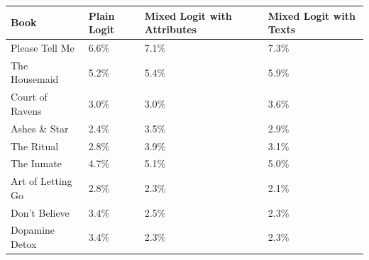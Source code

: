 \begin{centering}
\begin{tabular}{>{\raggedright}p{5cm}>{\raggedright}p{2cm}>{\centering}p{2cm}>{\centering}p{2cm}}
\hline
{\footnotesize\textbf{Book}} & {\footnotesize\textbf{Plain Logit}} & {\footnotesize\textbf{Mixed Logit with Attributes}} & {\footnotesize\textbf{Mixed Logit with Texts}}\tabularnewline
\hline
{\footnotesize Please Tell Me} & {\footnotesize 6.6\%} & {\footnotesize 7.1\%} & {\footnotesize 7.3\%}\tabularnewline
{\footnotesize The Housemaid} & {\footnotesize 5.2\%} & {\footnotesize 5.4\%} & {\footnotesize 5.9\%}\tabularnewline
{\footnotesize Court of Ravens} & {\footnotesize 3.0\%} & {\footnotesize 3.0\%} & {\footnotesize 3.6\%}\tabularnewline
{\footnotesize Ashes \& Star} & {\footnotesize 2.4\%} & {\footnotesize 3.5\%} & {\footnotesize 2.9\%}\tabularnewline
{\footnotesize The Ritual} & {\footnotesize 2.8\%} & {\footnotesize 3.9\%} & {\footnotesize 3.1\%}\tabularnewline
{\footnotesize The Inmate} & {\footnotesize 4.7\%} & {\footnotesize 5.1\%} & {\footnotesize 5.0\%}\tabularnewline
{\footnotesize Art of Letting Go} & {\footnotesize 2.8\%} & {\footnotesize 2.3\%} & {\footnotesize 2.1\%}\tabularnewline
{\footnotesize Don't Believe} & {\footnotesize 3.4\%} & {\footnotesize 2.5\%} & {\footnotesize 2.3\%}\tabularnewline
{\footnotesize Dopamine Detox} & {\footnotesize 3.4\%} & {\footnotesize 2.3\%} & {\footnotesize 2.3\%}\tabularnewline
\hline
\end{tabular}
\par\end{centering}